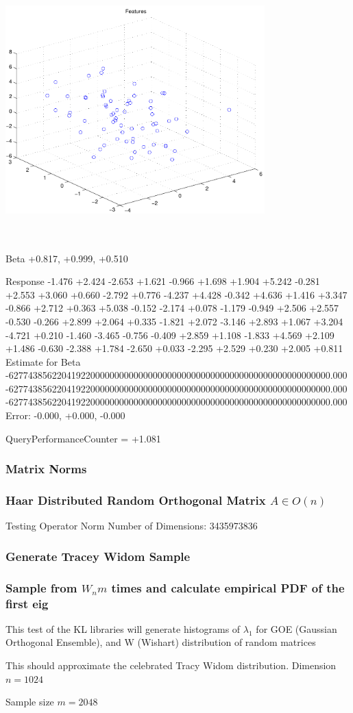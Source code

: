 \documentclass[12pt]{article}
\theoremstyle{definition}
\theoremstyle{remark}
\numberwithin{equation}{section}
\begin{document}
\includegraphics[width=10.0cm,height=10.0cm]{regression_features.pdf}

Beta
+0.817, +0.999, +0.510

Response
-1.476
+2.424
-2.653
+1.621
-0.966
+1.698
+1.904
+5.242
-0.281
+2.553
+3.060
+0.660
-2.792
+0.776
-4.237
+4.428
-0.342
+4.636
+1.416
+3.347
-0.866
+2.712
+0.363
+5.038
-0.152
-2.174
+0.078
-1.179
-0.949
+2.506
+2.557
-0.530
-0.266
+2.899
+2.064
+0.335
-1.821
+2.072
-3.146
+2.893
+1.067
+3.204
-4.721
+0.210
-1.460
-3.465
-0.756
-0.409
+2.859
+1.108
-1.833
+4.569
+2.109
+1.486
-0.630
-2.388
+1.784
-2.650
+0.033
-2.295
+2.529
+0.230
+2.005
+0.811
Estimate for Beta
-6277438562204192200000000000000000000000000000000000000000000000000.000
-6277438562204192200000000000000000000000000000000000000000000000000.000
-6277438562204192200000000000000000000000000000000000000000000000000.000
Error:
-0.000, +0.000, -0.000


QueryPerformanceCounter  =  +1.081
\subsubsection{Matrix Norms}
\subsubsection{Haar Distributed Random Orthogonal Matrix $A \in O(n)$}
 Testing Operator Norm
Number of Dimensions: 3435973836

\subsubsection{Generate Tracey Widom Sample}
\subsubsection{Sample from $W_n m$ times and calculate empirical PDF of the first eig}
This test of the KL libraries will generate histograms of 		  $\lambda_1$ for GOE (Gaussian Orthogonal Ensemble), and W (Wishart) 		  distribution of random matrices

This should approximate the celebrated Tracy Widom distribution.
Dimension $n = 1024$

Sample size $m = 2048$
\end{document}
